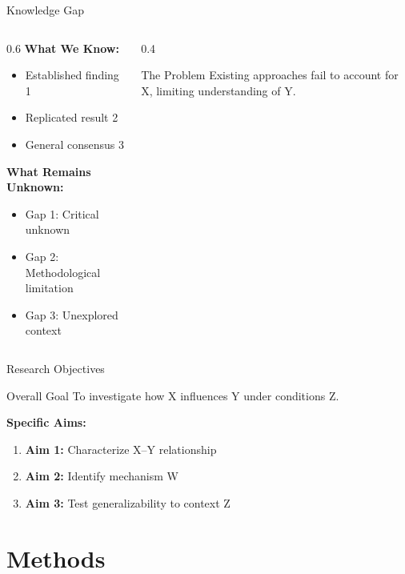 \documentclass[aspectratio=169,11pt]{beamer}
\begin{document}
\begin{frame}{Knowledge Gap}
  \begin{columns}[c]
    \begin{column}{0.6\textwidth}
      \textbf{What We Know:}
      \begin{itemize}
        \item Established finding 1
        \item Replicated result 2
        \item General consensus 3
      \end{itemize}
      \vspace{0.3cm}
      \textbf{What Remains Unknown:}
      \begin{itemize}
        \item \alert{Gap 1:} Critical unknown
        \item \alert{Gap 2:} Methodological limitation
        \item \alert{Gap 3:} Unexplored context
      \end{itemize}
    \end{column}
    \begin{column}{0.4\textwidth}
      \begin{alertblock}{The Problem}
        Existing approaches fail to account for X, limiting understanding of Y.
      \end{alertblock}
    \end{column}
  \end{columns}
\end{frame}

\begin{frame}{Research Objectives}
  \begin{exampleblock}{Overall Goal}
    To investigate how X influences Y under conditions Z.
  \end{exampleblock}
  \vspace{0.5cm}
  \textbf{Specific Aims:}
  \begin{enumerate}
    \item \textbf{Aim 1:} Characterize X–Y relationship
    \item \textbf{Aim 2:} Identify mechanism W
    \item \textbf{Aim 3:} Test generalizability to context Z
  \end{enumerate}
\end{frame}

\section{Methods}
\end{document}
